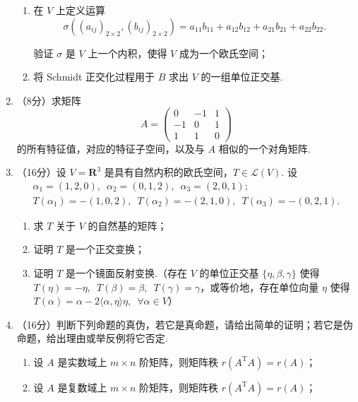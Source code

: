 \begin{enumerate}
\begin{enumerate}
        \item 在 $V$ 上定义运算
        \[\sigma\left((a_{ij})_{2 \times 2},\left(b_{ij}\right)_{2 \times 2}\right)=a_{11} b_{11}+a_{12} b_{12}+a_{21} b_{21}+a_{22} b_{22}.\]

        验证 $\sigma$ 是 $V$ 上一个内积，使得 $V$ 成为一个欧氏空间；

        \item 将 Schmidt 正交化过程用于 $B$ 求出 $V$ 的一组单位正交基.
    \end{enumerate}
	\item （8分）求矩阵
	\[A=\begin{pmatrix}
    0 & -1 & 1 \\
    -1 & 0 & 1 \\
    1 & 1 & 0
    \end{pmatrix}\]
    的所有特征值，对应的特征子空间，以及与 $A$ 相似的一个对角矩阵.
	\item （16分）设 $V=\mathbf{R}^3$ 是具有自然内积的欧氏空间，$T \in \mathcal{L}(V)$. 设
	\begin{gather*}
        \alpha_1=(1,2,0), \enspace \alpha_2=(0,1,2), \enspace \alpha_3=(2,0,1); \\
        T(\alpha_1)=-(1,0,2), \enspace T(\alpha_2)=-(2,1,0), \enspace T(\alpha_3)=-(0,2,1).
    \end{gather*}
    \begin{enumerate}
        \item 求 $T$ 关于 $V$ 的自然基的矩阵；

        \item 证明 $T$ 是一个正交变换；

        \item 证明 $T$ 是一个镜面反射变换.（存在 $V$ 的单位正交基 $\{\eta,\beta,\gamma\}$ 使得 $T(\eta)=-\eta,\enspace\allowbreak T(\beta)=\beta,\enspace\allowbreak T(\gamma)=\gamma$，或等价地，存在单位向量 $\eta$ 使得 $T(\alpha)=\alpha-2\langle\alpha, \eta\rangle \eta,\enspace\allowbreak \forall \alpha \in V$）
    \end{enumerate}
	\item （16分）判断下列命题的真伪，若它是真命题，请给出简单的证明；若它是伪命题，给出理由或举反例将它否定.
    \begin{enumerate}
        \item 设 $A$ 是实数域上 $m \times n$ 阶矩阵，则矩阵秩 $r\left(A^{\mathrm{T}} A\right)=r(A)$；

        \item 设 $A$ 是复数域上 $m \times n$ 阶矩阵，则矩阵秩 $r\left(A^{\mathrm{T}} A\right)=r(A)$；


\end{enumerate}
\end{enumerate}

